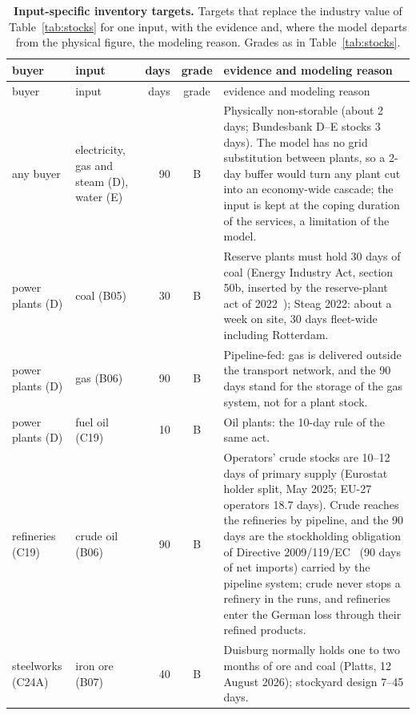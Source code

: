 \begingroup\footnotesize\setlength{\tabcolsep}{4pt}
\begin{longtable}{L{30mm}L{36mm}rcL{65mm}}
\caption{\textbf{Input-specific inventory targets.} Targets that replace the industry value of Table~\ref{tab:stocks} for one input, with the evidence and, where the model departs from the physical figure, the modeling reason. Grades as in Table~\ref{tab:stocks}.}
\label{tab:stockoverrides} \\
\toprule
buyer & input & days & grade & evidence and modeling reason \\
\midrule
\endfirsthead
\toprule
buyer & input & days & grade & evidence and modeling reason \\
\midrule
\endhead
any buyer & electricity, gas and steam (D), water (E) & 90 & B & Physically non-storable (about 2 days; Bundesbank D--E stocks 3 days). The model has no grid substitution between plants, so a 2-day buffer would turn any plant cut into an economy-wide cascade; the input is kept at the coping duration of the services, a limitation of the model. \\
power plants (D) & coal (B05) & 30 & B & Reserve plants must hold 30 days of coal (Energy Industry Act, section 50b, inserted by the reserve-plant act of 2022~\citep{ekbg2022}); Steag 2022: about a week on site, 30 days fleet-wide including Rotterdam. \\
power plants (D) & gas (B06) & 90 & B & Pipeline-fed: gas is delivered outside the transport network, and the 90 days stand for the storage of the gas system, not for a plant stock. \\
power plants (D) & fuel oil (C19) & 10 & B & Oil plants: the 10-day rule of the same act. \\
refineries (C19) & crude oil (B06) & 90 & B & Operators' crude stocks are 10--12 days of primary supply (Eurostat holder split, May 2025; EU-27 operators 18.7 days). Crude reaches the refineries by pipeline, and the 90 days are the stockholding obligation of Directive 2009/119/EC~\citep{council2009oilstocks} (90 days of net imports) carried by the pipeline system; crude never stops a refinery in the runs, and refineries enter the German loss through their refined products. \\
steelworks (C24A) & iron ore (B07) & 40 & B & Duisburg normally holds one to two months of ore and coal (Platts, 12 August 2026); stockyard design 7--45 days. \\

\end{longtable}
